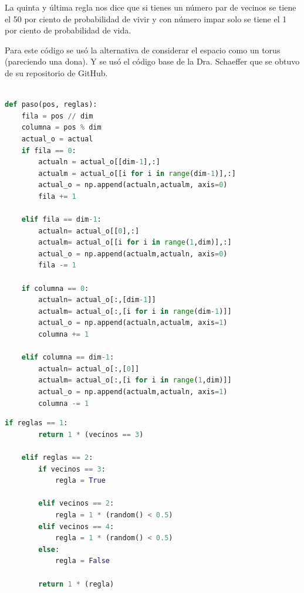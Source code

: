 \documentclass{article}
\begin{document}
La quinta y última regla nos dice que si tienes un número par de vecinos se tiene el 50 por ciento de probabilidad de vivir y con número impar solo se tiene el 1 por ciento de probabilidad de vida.

Para este código se usó la alternativa de considerar el espacio como un torus (pareciendo una dona). Y se usó el código base de la Dra. Schaeffer que se obtuvo de su repositorio de GitHub\cite{Elisa_Schaeffer}.\\


\lstset{style=mystyle}
\begin{lstlisting}[language=Python, caption= Código para considerar el espacio como un torus]

def paso(pos, reglas):
    fila = pos // dim
    columna = pos % dim
    actual_o = actual
    if fila == 0:
        actualn = actual_o[[dim-1],:]
        actualm = actual_o[[i for i in range(dim-1)],:]
        actual_o = np.append(actualn,actualm, axis=0)
        fila += 1

    elif fila == dim-1:
        actualn= actual_o[[0],:]
        actualm= actual_o[[i for i in range(1,dim)],:]
        actual_o = np.append(actualm,actualn, axis=0)
        fila -= 1

    if columna == 0:
        actualn= actual_o[:,[dim-1]]
        actualm= actual_o[:,[i for i in range(dim-1)]]
        actual_o = np.append(actualn,actualm, axis=1)
        columna += 1

    elif columna == dim-1:
        actualn= actual_o[:,[0]]
        actualm= actual_o[:,[i for i in range(1,dim)]]
        actual_o = np.append(actualm,actualn, axis=1)
        columna -= 1
\end{lstlisting}

\begin{lstlisting}[language=Python, caption= Código para reglas de supervivencia]
    if reglas == 1:
        return 1 * (vecinos == 3)
    
    elif reglas == 2:
        if vecinos == 3:
            regla = True
            
        elif vecinos == 2:
            regla = 1 * (random() < 0.5)
        elif vecinos == 4:
            regla = 1 * (random() < 0.5)
        else:
            regla = False
           
        return 1 * (regla)
    
  
\end{lstlisting}
\end{document}

